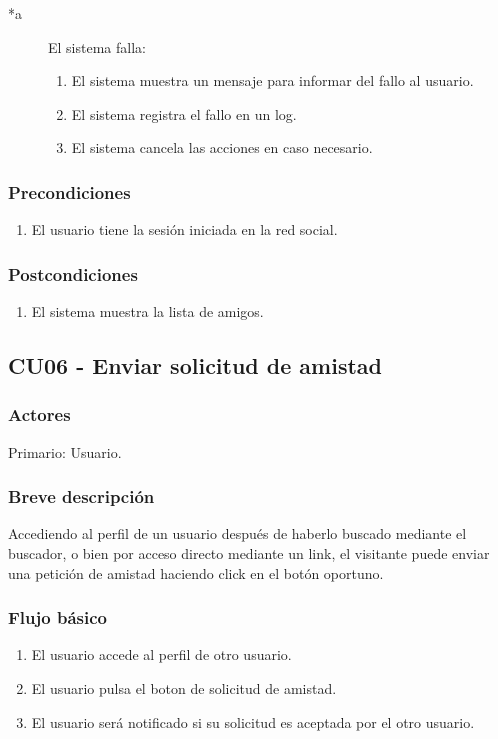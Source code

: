 \documentclass[12pt, a4paper, titlepage]{article}
\begin{document}
\begin{description}
	\item [*a] El sistema falla:
	\begin{enumerate}
		\item El sistema muestra un mensaje para informar del fallo al usuario.
		\item El sistema registra el fallo en un log.
		\item El sistema cancela las acciones en caso necesario.
	\end{enumerate}
\end{description}

\subsubsection{Precondiciones}
\begin{enumerate}
	\item El usuario tiene la sesión iniciada en la red social.
\end{enumerate}
\subsubsection{Postcondiciones}
\begin{enumerate}
	\item El sistema muestra la lista de amigos.
\end{enumerate}



\subsection{CU06 - Enviar solicitud de amistad}
\subsubsection{Actores}
Primario: Usuario.
\subsubsection{Breve descripción}
 Accediendo al perfil de un usuario después de haberlo buscado mediante el buscador, o bien por acceso directo mediante un link, el visitante puede enviar una petición de amistad haciendo click en el botón oportuno.
\subsubsection{Flujo básico}
\begin{enumerate}
	\item El usuario accede al perfil de otro usuario.
	\item El usuario pulsa el boton de solicitud de amistad.
	\item El usuario será notificado si su solicitud es aceptada por el otro usuario.
\end{enumerate}
\end{document}
